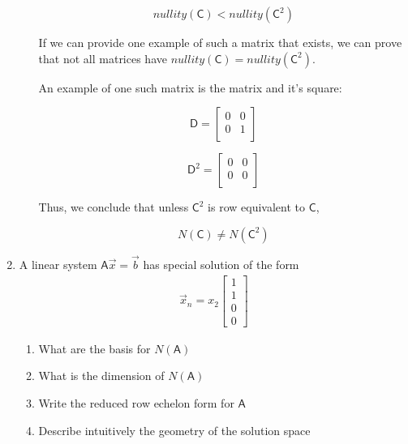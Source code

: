 \documentclass[a4paper, 11pt]{article}
\newcommand{\mat}[1]{\boldsymbol { \mathsf{#1}} }
\begin{document}
\begin{enumerate}
\begin{enumerate}[label=\alph*]
	    \begin{equation*}
	        nullity(\mat{C}) < nullity(\mat{C}^2)
	    \end{equation*}
	    
	    If we can provide one example of such a matrix that exists, we can prove that not all matrices have $nullity(\mat{C}) = nullity(\mat{C}^2)$.
	    
	    An example of one such matrix is the matrix and it's square:
	    
	    \begin{equation*}
	        \mat{D} = 
	        \begin{bmatrix}
	            0 & 0 \\
	            0 & 1 \\
	        \end{bmatrix}
	    \end{equation*}
	 
	    \begin{equation*}
	        \mat{D}^2 = 
	        \begin{bmatrix}
	            0 & 0 \\
	            0 & 0 \\
	        \end{bmatrix}
	    \end{equation*}
	    
	    Thus, we conclude that unless $\mat{C}^2$ is row equivalent to $\mat{C}$,
	    
	    \begin{equation*}
            N(\mat{C}) \neq N(\mat{C}^2)
	    \end{equation*}
	    
	    \end{enumerate}
    
\item A linear system $\mat A \vec x = \vec b$ has special solution of the form
\begin{align}
 \vec x_n = x_2 \begin{bmatrix} 1 \\ 1 \\ 0 \\ 0 \end{bmatrix}
 \end{align} 
\begin{enumerate}[label=(\alph*)]
\item What are the basis for $N(\mat A)$
\item What is the dimension of $N(\mat A)$
\item Write the reduced row echelon form for $\mat A$
\item Describe intuitively the geometry of the solution space
\end{enumerate}


\end{enumerate}
\end{document}
